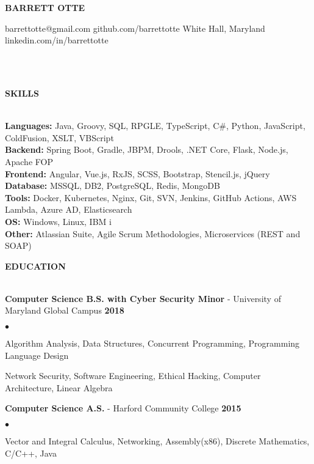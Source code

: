 \documentclass{article}
\newcommand{\lineunder}{
	\vspace*{-4pt}\\ 
	\hspace*{-18pt}\hrulefill \\
}
\newcommand{\header}[1]{
	{\hspace*{-15pt}\vspace*{6pt}\textsc{#1}}\vspace*{-6pt}\lineunder
}
\newcommand{\contact}[5]{
	\begin{center}
		{\Large \textbf \scshape \bfseries{#1}}
	\end{center}
	\small{#2} \hfill \small{#3} \break
	\small{#4} \hfill \small{#5} \break
	\vspace*{-6pt}
	\lineunder
	\vspace*{-6pt}
}
\newcommand{\education}[3]{
	\textbf{#1} - #2 \hfill \textbf{#3} \vspace*{3pt}
}
\newenvironment{resumelist}{
	\vspace*{2pt}
	\begin{list}
		{\small$\bullet$}{\topsep 0pt \itemsep -2pt}}{\vspace*{4pt}
	\end{list}
}
\newcommand{\resumeheader}[1]{
	\vspace*{14pt}
	\header{\textbf{#1}}
    \vspace*{5pt}
}
\begin{document}
	\normalsize
	\smallskip
	\vspace*{-44pt}

	\contact
		{BARRETT OTTE}
		{barrettotte@gmail.com}
		{github.com/barrettotte}
		{White Hall, Maryland}
		{linkedin.com/in/barrettotte}

	\resumeheader{SKILLS}
		\textbf{Languages:}
			Java, Groovy, SQL, RPGLE, TypeScript, C\#, Python, JavaScript, ColdFusion, XSLT, VBScript\\
			\vspace*{5pt}
        \textbf{Backend:}
			Spring Boot, Gradle, JBPM, Drools, .NET Core, Flask, Node.js, Apache FOP\\
			\vspace*{5pt}
		\textbf{Frontend:}
			Angular, Vue.js, RxJS, SCSS, Bootstrap, Stencil.js, jQuery\\
			\vspace*{5pt}
        \textbf{Database:}
			MSSQL, DB2, PostgreSQL, Redis, MongoDB\\
			\vspace*{5pt}
		\textbf{Tools:}
			Docker, Kubernetes, Nginx, Git, SVN, Jenkins, GitHub Actions, AWS Lambda, Azure AD, Elasticsearch\\
			\vspace*{5pt}
        \textbf{OS:}
            Windows, Linux, IBM i\\
			\vspace*{5pt}
		\textbf{Other:}
			Atlassian Suite, Agile Scrum Methodologies, Microservices (REST and SOAP)

	\resumeheader{EDUCATION}
		\education 
			{Computer Science B.S. with Cyber Security Minor}{University of Maryland Global Campus} 
			{2018}
            \begin{resumelist}
                \item Algorithm Analysis, Data Structures, Concurrent Programming, Programming Language Design
                \item Network Security, Software Engineering, Ethical Hacking, Computer Architecture, Linear Algebra
            \end{resumelist}
            \vspace*{6pt}
		\education
			{Computer Science A.S.}{Harford Community College}
			{2015}
            \begin{resumelist}
                \item Vector and Integral Calculus, Networking, Assembly(x86), Discrete Mathematics, C/C++, Java
            \end{resumelist}
\end{document}
